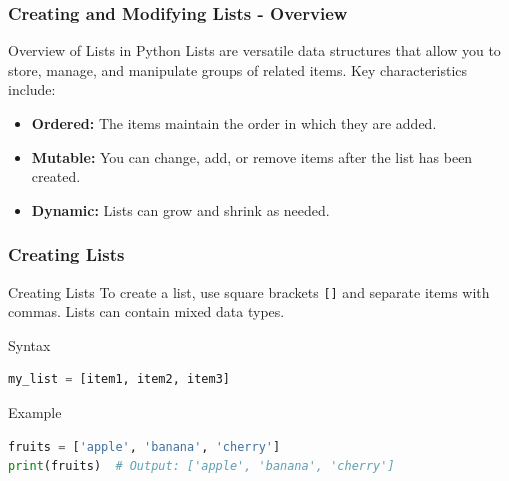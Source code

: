 \documentclass{beamer}
\begin{document}
\begin{frame}[fragile]
    \frametitle{Creating and Modifying Lists - Overview}
    \begin{block}{Overview of Lists in Python}
        Lists are versatile data structures that allow you to store, manage, and manipulate groups of related items. Key characteristics include:
    \end{block}
    \begin{itemize}
        \item \textbf{Ordered:} The items maintain the order in which they are added.
        \item \textbf{Mutable:} You can change, add, or remove items after the list has been created.
        \item \textbf{Dynamic:} Lists can grow and shrink as needed.
    \end{itemize}
\end{frame}

\begin{frame}[fragile]
    \frametitle{Creating Lists}
    \begin{block}{Creating Lists}
        To create a list, use square brackets \texttt{[]} and separate items with commas. Lists can contain mixed data types.
    \end{block}
    
    \begin{block}{Syntax}
        \begin{lstlisting}[language=Python]
my_list = [item1, item2, item3]
        \end{lstlisting}
    \end{block}

    \begin{block}{Example}
        \begin{lstlisting}[language=Python]
fruits = ['apple', 'banana', 'cherry']
print(fruits)  # Output: ['apple', 'banana', 'cherry']
        \end{lstlisting}
    \end{block}
\end{frame}
\end{document}

